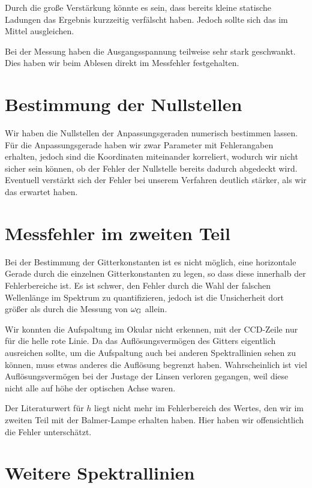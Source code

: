 Durch die große Verstärkung könnte es sein, dass bereits kleine statische
Ladungen das Ergebnis kurzzeitig verfälscht haben. Jedoch sollte sich das im
Mittel ausgleichen.

Bei der Messung haben die Ausgangsspannung teilweise sehr stark geschwankt.
Dies haben wir beim Ablesen direkt im Messfehler festgehalten.

\section{Bestimmung der Nullstellen}

Wir haben die Nullstellen der Anpassungsgeraden numerisch bestimmen lassen. Für
die Anpassungsgerade haben wir zwar Parameter mit Fehlerangaben erhalten,
jedoch sind die Koordinaten miteinander korreliert, wodurch wir nicht sicher
sein können, ob der Fehler der Nullstelle bereits dadurch abgedeckt wird.
Eventuell verstärkt sich der Fehler bei unserem Verfahren deutlich stärker, als
wir das erwartet haben.

\section{Messfehler im zweiten Teil}

Bei der Bestimmung der Gitterkonstanten ist es nicht möglich, eine horizontale
Gerade durch die einzelnen Gitterkonstanten zu legen, so dass diese innerhalb
der Fehlerbereiche ist. Es ist schwer, den Fehler durch die Wahl der falschen
Wellenlänge im Spektrum zu quantifizieren, jedoch ist die Unsicherheit dort
größer als durch die Messung von $\omega_\text G$ allein.

Wir konnten die Aufspaltung im Okular nicht erkennen, mit der CCD-Zeile nur für
die helle rote Linie. Da das Auflösungsvermögen des Gitters eigentlich
ausreichen sollte, um die Aufspaltung auch bei anderen Spektrallinien sehen zu
können, muss etwas anderes die Auflösung begrenzt haben. Wahrscheinlich ist
viel Auflösungsvermögen bei der Justage der Linsen verloren gegangen, weil
diese nicht alle auf höhe der optischen Achse waren.

Der Literaturwert für $h$ liegt nicht mehr im Fehlerbereich des Wertes, den wir
im zweiten Teil mit der Balmer-Lampe erhalten haben. Hier haben wir
offensichtlich die Fehler unterschätzt.

\section{Weitere Spektrallinien}

